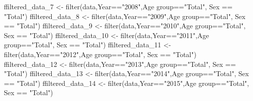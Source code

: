 \documentclass[
  11pt,
  a4paper,
  DIV=11,
  numbers=noendperiod]{scrartcl}
\newenvironment{Shaded}{\begin{snugshade}}{\end{snugshade}}
\newcommand{\AttributeTok}[1]{\textcolor[rgb]{0.40,0.45,0.13}{#1}}
\newcommand{\FunctionTok}[1]{\textcolor[rgb]{0.28,0.35,0.67}{#1}}
\newcommand{\NormalTok}[1]{\textcolor[rgb]{0.00,0.23,0.31}{#1}}
\newcommand{\OtherTok}[1]{\textcolor[rgb]{0.00,0.23,0.31}{#1}}
\newcommand{\SpecialCharTok}[1]{\textcolor[rgb]{0.37,0.37,0.37}{#1}}
\newcommand{\StringTok}[1]{\textcolor[rgb]{0.13,0.47,0.30}{#1}}
\begin{document}
\begin{Shaded}
\begin{Highlighting}[]
\NormalTok{ffiltered\_data\_7 }\OtherTok{\textless{}{-}} \FunctionTok{filter}\NormalTok{(data,Year}\SpecialCharTok{==}\StringTok{"2008"}\NormalTok{,}\StringTok{\textasciigrave{}}\AttributeTok{Age group}\StringTok{\textasciigrave{}}\SpecialCharTok{==}\StringTok{"Total"}\NormalTok{, Sex }\SpecialCharTok{==} \StringTok{"Total"}\NormalTok{)}
\NormalTok{ffiltered\_data\_8 }\OtherTok{\textless{}{-}} \FunctionTok{filter}\NormalTok{(data,Year}\SpecialCharTok{==}\StringTok{"2009"}\NormalTok{,}\StringTok{\textasciigrave{}}\AttributeTok{Age group}\StringTok{\textasciigrave{}}\SpecialCharTok{==}\StringTok{"Total"}\NormalTok{, Sex }\SpecialCharTok{==} \StringTok{"Total"}\NormalTok{)}
\NormalTok{ffiltered\_data\_9 }\OtherTok{\textless{}{-}} \FunctionTok{filter}\NormalTok{(data,Year}\SpecialCharTok{==}\StringTok{"2010"}\NormalTok{,}\StringTok{\textasciigrave{}}\AttributeTok{Age group}\StringTok{\textasciigrave{}}\SpecialCharTok{==}\StringTok{"Total"}\NormalTok{, Sex }\SpecialCharTok{==} \StringTok{"Total"}\NormalTok{)}
\NormalTok{ffiltered\_data\_10 }\OtherTok{\textless{}{-}} \FunctionTok{filter}\NormalTok{(data,Year}\SpecialCharTok{==}\StringTok{"2011"}\NormalTok{,}\StringTok{\textasciigrave{}}\AttributeTok{Age group}\StringTok{\textasciigrave{}}\SpecialCharTok{==}\StringTok{"Total"}\NormalTok{, Sex }\SpecialCharTok{==} \StringTok{"Total"}\NormalTok{)}
\NormalTok{ffiltered\_data\_11 }\OtherTok{\textless{}{-}} \FunctionTok{filter}\NormalTok{(data,Year}\SpecialCharTok{==}\StringTok{"2012"}\NormalTok{,}\StringTok{\textasciigrave{}}\AttributeTok{Age group}\StringTok{\textasciigrave{}}\SpecialCharTok{==}\StringTok{"Total"}\NormalTok{, Sex }\SpecialCharTok{==} \StringTok{"Total"}\NormalTok{)}
\NormalTok{ffiltered\_data\_12 }\OtherTok{\textless{}{-}} \FunctionTok{filter}\NormalTok{(data,Year}\SpecialCharTok{==}\StringTok{"2013"}\NormalTok{,}\StringTok{\textasciigrave{}}\AttributeTok{Age group}\StringTok{\textasciigrave{}}\SpecialCharTok{==}\StringTok{"Total"}\NormalTok{, Sex }\SpecialCharTok{==} \StringTok{"Total"}\NormalTok{)}
\NormalTok{ffiltered\_data\_13 }\OtherTok{\textless{}{-}} \FunctionTok{filter}\NormalTok{(data,Year}\SpecialCharTok{==}\StringTok{"2014"}\NormalTok{,}\StringTok{\textasciigrave{}}\AttributeTok{Age group}\StringTok{\textasciigrave{}}\SpecialCharTok{==}\StringTok{"Total"}\NormalTok{, Sex }\SpecialCharTok{==} \StringTok{"Total"}\NormalTok{)}
\NormalTok{ffiltered\_data\_14 }\OtherTok{\textless{}{-}} \FunctionTok{filter}\NormalTok{(data,Year}\SpecialCharTok{==}\StringTok{"2015"}\NormalTok{,}\StringTok{\textasciigrave{}}\AttributeTok{Age group}\StringTok{\textasciigrave{}}\SpecialCharTok{==}\StringTok{"Total"}\NormalTok{, Sex }\SpecialCharTok{==} \StringTok{"Total"}\NormalTok{)}

\end{Highlighting}
\end{Shaded}
\end{document}
